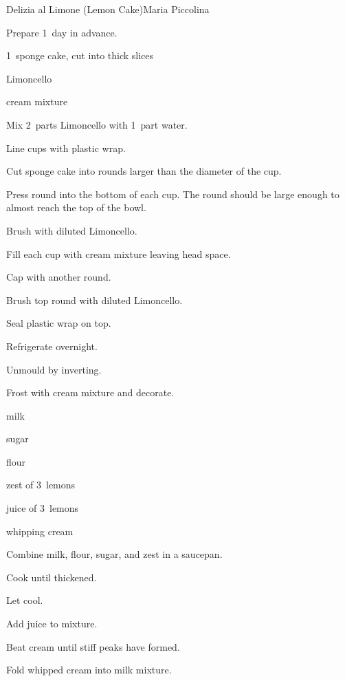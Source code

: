 \begin{recipe}{Delizia al Limone (Lemon Cake)}{Maria Piccolina}{}

Prepare 1~day in advance.

\begin{ingredients}
\item 1~sponge cake, cut into  thick slices
\item Limoncello
\item cream mixture
\end{ingredients}

\begin{directions}
\item Mix 2~parts Limoncello with 1~part water.
\item Line cups with plastic wrap.
\item Cut sponge cake into rounds larger than the diameter of the cup.
\item Press round into the bottom of each cup. The round should be large enough to almost reach the top of the bowl.
\item Brush with diluted Limoncello.
\item Fill each cup with cream mixture leaving  head space.
\item Cap with another round.
\item Brush top round with diluted Limoncello.
\item Seal plastic wrap on top.
\item Refrigerate overnight.
\item Unmould by inverting.
\item Frost with cream mixture and decorate.
\end{directions}



\begin{ingredients}
\item {} milk
\item {} sugar
\item {} flour
\item zest of 3~lemons
\item juice of 3~lemons
\item {} whipping cream
\end{ingredients}

\begin{directions}
\item Combine milk, flour, sugar, and zest in a saucepan.
\item Cook until thickened.
\item Let cool.
\item Add juice to mixture.
\item Beat cream until stiff peaks have formed.
\item Fold whipped cream into milk mixture.
\end{directions}
\end{recipe}
